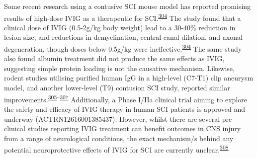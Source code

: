 \documentclass[
]{article}
\begin{document}
Some recent research using a contusive SCI mouse model has reported promising results of high-dose IVIG as a therapeutic for SCI.\textsuperscript{\protect\hyperlink{ref-brennan_ivig_2016}{304}}
The study found that a clinical dose of IVIG (0.5-2g/kg body weight) lead to a 30-40\% reduction in lesion size, and reductions in demyelination, central canal dilation, and axonal degeneration, though doses below 0.5g/kg were ineffective.\textsuperscript{\protect\hyperlink{ref-brennan_ivig_2016}{304}}
The same study also found albumin treatment did not produce the same effects as IVIG, suggesting simple protein loading is not the causative mechanism.
Likewise, rodent studies utilising purified human IgG in a high-level (C7-T1) clip aneurysm model, and another lower-level (T9) contusion SCI study, reported similar improvements.\textsuperscript{\protect\hyperlink{ref-nguyen_immunoglobulin_2012}{305}--\protect\hyperlink{ref-gok_immunomodulation_2009}{307}}
Additionally, a Phase I/IIa clinical trial aiming to explore the safety and efficacy of IVIG therapy in human SCI patients is approved and underway (ACTRN12616001385437).
However, whilst there are several pre-clinical studies reporting IVIG treatment can benefit outcomes in CNS injury from a range of neurological conditions, the exact mechanism/s behind any potential neuroprotective effects of IVIG for SCI are currently unclear.\textsuperscript{\protect\hyperlink{ref-tzekou_treatment_2014}{308}}
\end{document}
